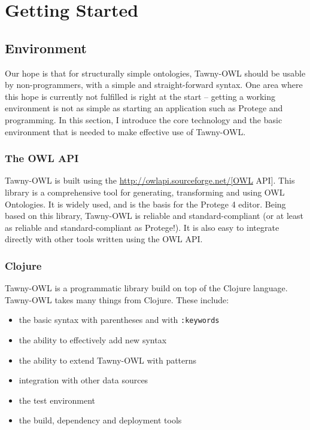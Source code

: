 \chapter{Getting Started}

\section{Environment}
\label{sec-3}

Our hope is that for structurally simple ontologies, Tawny-OWL should be
usable by non-programmers, with a simple and straight-forward syntax.
One area where this hope is currently not fulfilled is right at the
start -- getting a working environment is not as simple as starting an
application such as Protege and programming. In this section, I
introduce the core technology and the basic environment that is needed
to make effective use of Tawny-OWL.


\subsection{The OWL API}
\label{sec-3-1}

Tawny-OWL is built using the \url{http://owlapi.sourceforge.net/[OWL} API].
This library is a comprehensive tool for generating, transforming and
using OWL Ontologies. It is widely used, and is the basis for the
Protege 4 editor. Being based on this library, Tawny-OWL is reliable and
standard-compliant (or at least as reliable and standard-compliant as
Protege!). It is also easy to integrate directly with other tools
written using the OWL API.

\subsection{Clojure}
\label{sec-3-2}

Tawny-OWL is a programmatic library build on top of the Clojure
language. Tawny-OWL takes many things from Clojure. These include:

\begin{itemize}
\item the basic syntax with parentheses and with \texttt{:keywords}
\item the ability to effectively add new syntax
\item the ability to extend Tawny-OWL with patterns
\item integration with other data sources
\item the test environment
\item the build, dependency and deployment tools
\end{itemize}

